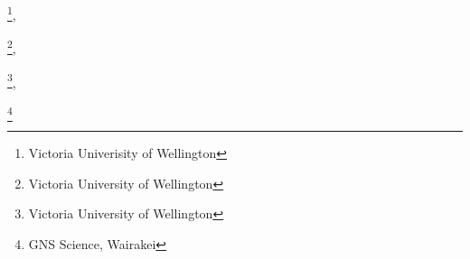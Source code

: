 \author{Chet Hopp}\footnote{Victoria Univerisity of Wellington}, \author{Martha Savage}\footnote{Victoria University of Wellington}, \author{John Townend}\footnote{Victoria University of Wellington},\author{Steve Sherburn}\footnote{GNS Science, Wairakei}
